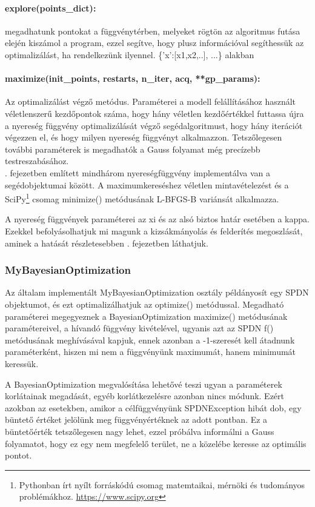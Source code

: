 \paragraph{explore(points\_dict):} megadhatunk pontokat a függvénytérben, melyeket rögtön az algoritmus futása elején kiszámol a program, ezzel segítve, hogy plusz információval segíthessük az optimalizálást, ha rendelkezünk ilyennel. \{'x':[x1,x2,..], ...\} alakban
\paragraph{maximize(init\_points, restarts, n\_iter, acq, **gp\_params):} Az optimalizálást végző metódus. Paraméterei a modell felállításához használt véletlenszerű kezdőpontok száma, hogy hány véletlen kezdőértékkel futtassa újra a nyereség függvény optimalizálását végző segédalgoritmust, hogy hány iterációt végezzen el, és hogy milyen nyereség függvényt alkalmazzon. Tetszőlegesen további paraméterek is megadhatók a Gauss folyamat még precízebb testreszabásához.\\

. fejezetben említett mindhárom nyereségfüggvény implementálva van a segédobjektumai között. A maximumkereséshez véletlen mintavételezést és a SciPy\footnote{Pythonban írt nyílt forráskódú csomag matemtaikai, mérnöki és tudományos problémákhoz. \url{https://www.scipy.org}} csomag minimize() metódusának L-BFGS-B variánsát alkalmazza.

A nyereség függvények paraméterei az xi és az alsó biztos határ esetében a kappa. Ezekkel befolyásolhatjuk mi magunk a kizsákmányolás és felderítés megoszlását, aminek a hatását részletesebben . fejezetben láthatjuk.

\subsubsection{MyBayesianOptimization}
Az általam implementált MyBayesianOptimization osztály példányosít egy SPDN objektumot, és ezt optimalizálhatjuk az optimize() metódussal. Megadható paraméterei megegyeznek a BayesianOptimization maximize() metódusának paramétereivel, a hívandó függvény kivételével, ugyanis azt az SPDN f() metódusának meghívásával kapjuk, ennek azonban a -1-szeresét kell átadnunk paraméterként, hiszen mi nem a függvényünk maximumát, hanem minimumát keressük.

A BayesianOptimization megvalósítása lehetővé teszi ugyan a paraméterek korlátainak megadását, egyéb korlátkezelésre azonban nincs módunk. Ezért azokban az esetekben, amikor a célfüggvényünk SPDNException hibát dob, egy büntető értéket jelölünk meg függvényértéknek az adott pontban. Ez a büntetőérték tetszőlegesen nagy lehet, ezzel próbálva informálni a Gauss folyamatot, hogy ez egy nem megfelelő terület, ne a közelébe keresse az optimális pontot.

